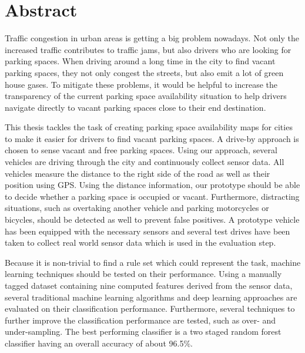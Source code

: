 

\chapter*{Abstract}

Traffic congestion in urban areas is getting a big problem nowadays. Not only the increased traffic contributes to traffic jams, but also drivers who are looking for parking spaces. When driving around a long time in the city to find vacant parking spaces, they not only congest the streets, but also emit a lot of green house gases.
To mitigate these problems, it would be helpful to increase the transparency of the current parking space availability situation to help drivers navigate directly to vacant parking spaces close to their end destination. 

This thesis tackles the task of creating parking space availability maps for cities to make it easier for drivers to find vacant parking spaces. A drive-by approach is chosen to sense vacant and free parking spaces. 
Using our approach, several vehicles are driving through the city and continuously collect sensor data. All vehicles measure the distance to the right side of the road as well as their position using GPS. Using the distance information, our prototype should be able to decide whether a parking space is occupied or vacant. Furthermore, distracting situations, such as overtaking another vehicle and parking motorcycles or bicycles, should be detected as well to prevent false positives. A prototype vehicle has been equipped with the necessary sensors and several test drives have been taken to collect real world sensor data which is used in the evaluation step.

Because it is non-trivial to find a rule set which could represent the task, machine learning techniques should be tested on their performance. Using a manually tagged dataset containing nine computed features derived from the sensor data, several traditional machine learning algorithms and deep learning approaches are evaluated on their classification performance. Furthermore, several techniques to further improve the classification performance are tested, such as over- and under-sampling. The best performing classifier is a two staged random forest classifier having an overall accuracy of about 96.5\%.
